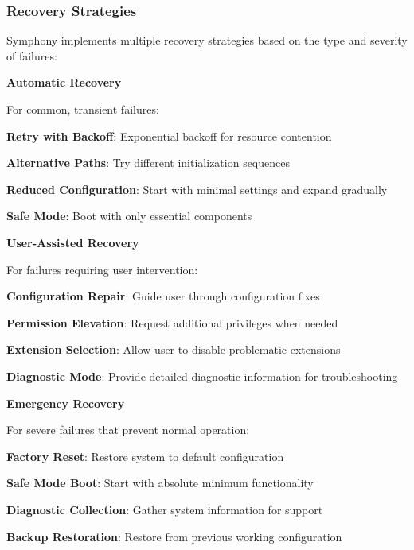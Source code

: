 \subsubsection{Recovery Strategies}

Symphony implements multiple recovery strategies based on the type and severity of failures:

\textbf{Automatic Recovery}

For common, transient failures:

\begin{compactlist}
    \item \textbf{Retry with Backoff}: Exponential backoff for resource contention
    \item \textbf{Alternative Paths}: Try different initialization sequences
    \item \textbf{Reduced Configuration}: Start with minimal settings and expand gradually
    \item \textbf{Safe Mode}: Boot with only essential components
\end{compactlist}

\textbf{User-Assisted Recovery}

For failures requiring user intervention:

\begin{compactlist}
    \item \textbf{Configuration Repair}: Guide user through configuration fixes
    \item \textbf{Permission Elevation}: Request additional privileges when needed
    \item \textbf{Extension Selection}: Allow user to disable problematic extensions
    \item \textbf{Diagnostic Mode}: Provide detailed diagnostic information for troubleshooting
\end{compactlist}

\textbf{Emergency Recovery}

For severe failures that prevent normal operation:

\begin{compactlist}
    \item \textbf{Factory Reset}: Restore system to default configuration
    \item \textbf{Safe Mode Boot}: Start with absolute minimum functionality
    \item \textbf{Diagnostic Collection}: Gather system information for support
    \item \textbf{Backup Restoration}: Restore from previous working configuration
\end{compactlist}

